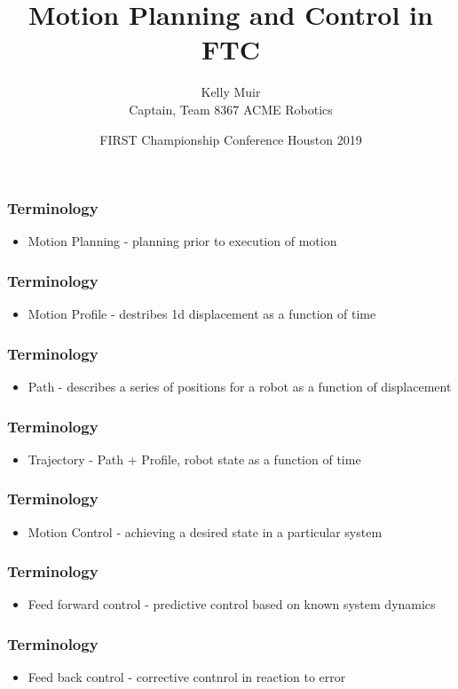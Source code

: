 \documentclass{beamer}
\title{Motion Planning and Control in FTC}
\author{Kelly Muir\\Captain, Team 8367 ACME Robotics}
\date{FIRST Championship Conference Houston 2019}
\begin{document}
\frame{\titlepage}

\begin{frame}
\frametitle{Terminology}
	\begin{itemize}
		\item {Motion Planning - planning prior to execution of motion}
	\end{itemize}
\end{frame}

\begin{frame}
\frametitle{Terminology}
	\begin{itemize}
		\item {Motion Profile - destribes 1d displacement as a function of time}
	\end{itemize}
\end{frame}

\begin{frame}
\frametitle{Terminology}
	\begin{itemize}
		\item {Path - describes a series of positions for a robot as a function of displacement}
	\end{itemize}
\end{frame}

\begin{frame}
\frametitle{Terminology}
	\begin{itemize}
		\item {Trajectory - Path + Profile, robot state as a function of time}
	\end{itemize}
\end{frame}

\begin{frame}
\frametitle{Terminology}
	\begin{itemize}
		\item {Motion Control - achieving a desired state in a particular system}
	\end{itemize}
\end{frame}

\begin{frame}
\frametitle{Terminology}
	\begin{itemize}
		\item {Feed forward control - predictive control based on known system dynamics}
	\end{itemize}
\end{frame}

\begin{frame}
\frametitle{Terminology}
	\begin{itemize}
		\item {Feed back control - corrective contnrol in reaction to error}
	\end{itemize}
\end{frame}
\end{document}

